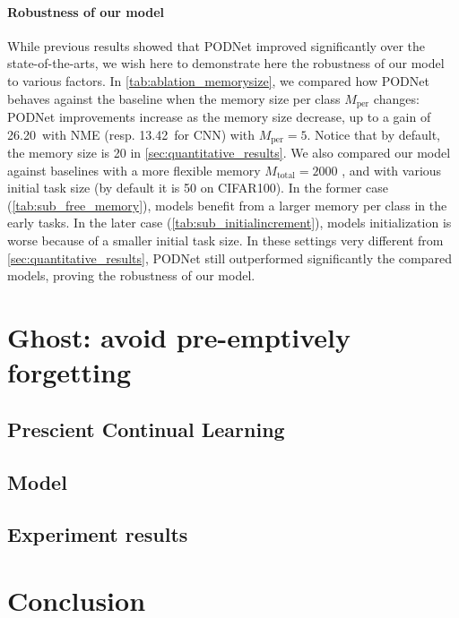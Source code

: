 \label{sec:robustness}
\paragraph{Robustness of our model} While previous results showed that PODNet improved significantly
over the state-of-the-arts, we wish here to demonstrate here the robustness of our model to various
factors. In \autoref{tab:ablation_memorysize}, we compared how PODNet behaves against the baseline
when the memory size per class $M_{\text{per}}$ changes: PODNet improvements increase as the memory
size decrease, up to a gain of 26.20\pp\ with NME (resp. 13.42\pp\ for CNN) with $M_{\text{per}} =
    5$. Notice that by default, the memory size is 20 in \autoref{sec:quantitative_results}.
We also compared our model against baselines with a more flexible memory $M_{\text{total}} = 2000$
\citep{rebuffi2017icarl,wu2019bias_correction}, and with various initial task size (by default it is
50 on CIFAR100). In the former case (\autoref{tab:sub_free_memory}), models benefit from a larger
memory per class in the early tasks. In the later case (\autoref{tab:sub_initialincrement}), models
initialization is worse because of a smaller initial task size. In these settings very different
from \autoref{sec:quantitative_results}, PODNet still outperformed significantly the compared
models, proving the robustness of our model.





\section{Ghost: avoid pre-emptively forgetting}

\subsection{Prescient Continual Learning}

\subsection{Model}

\subsection{Experiment results}


\section{Conclusion}

